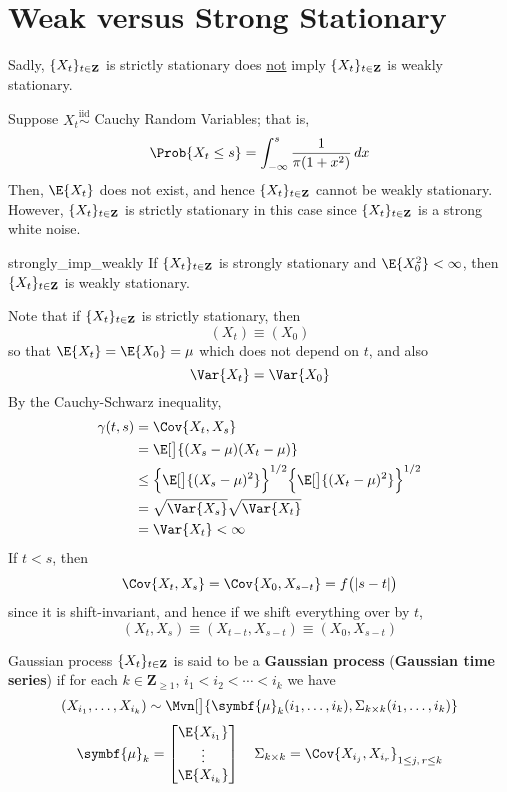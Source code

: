 \section{Weak versus Strong Stationary}
Sadly, $ \{X_t\}_{t\in\mathbf{Z}} $ is strictly stationary does \underline{not} imply
$ \{X_t\}_{t\in\mathbf{Z}} $ is weakly stationary.
\begin{Example}{}{}
    Suppose $ X_t\stackrel{\text{iid}}{\sim} $ Cauchy Random Variables;
    that is,
    \[ \Prob{X_t\le s}=\int_{-\infty}^{s} \frac{1}{\pi(1+x^2)}\, d{x}  \]
    Then, $ \E{X_t} $ does not exist, and hence $ \{X_t\}_{t\in\mathbf{Z}} $ cannot
    be weakly stationary. However, $ \{X_t\}_{t\in\mathbf{Z}} $ is strictly
    stationary in this case since $ \{X_t\}_{t\in\mathbf{Z}} $ is a strong
    white noise.
\end{Example}
\begin{Theorem}{}{strongly_imp_weakly}
    If $ \{X_t\}_{t\in\mathbf{Z}} $ is strongly stationary and $ \E{X_0^2}<\infty $,
    then $ \{X_t\}_{t\in\mathbf{Z}} $ is weakly stationary.
\end{Theorem}
\begin{Proof}{}{}
    Note that if $ \{X_t\}_{t\in\mathbf{Z}} $ is strictly stationary, then
    \[ (X_t)\equiv(X_0) \]
    so that $ \E{X_t}=\E{X_0}=\mu $ which does not depend on $ t $, and also
    \[ \Var{X_t}=\Var{X_0} \]
    By the Cauchy-Schwarz inequality,
    \begin{align*}
        \gamma(t,s)
         & =\Cov{X_t,X_s}                                                                     \\
         & =\E[\big]{(X_s-\mu)(X_t-\mu)}                                                      \\
         & \le \set[\Big]{\E[\big]{(X_s-\mu)^2}}^{1/2}\set[\Big]{\E[\big]{(X_t-\mu)^2}}^{1/2} \\
         & =\sqrt{\Var{X_s}}\sqrt{\Var{X_t}}                                                  \\
         & =\Var{X_t}<\infty
    \end{align*}
    If $ t<s $, then
    \[ \Cov{X_t,X_s}=\Cov{X_0,X_{s-t}}=f\bigl(\abs{s-t}\bigr) \]
    since it is shift-invariant, and hence if we shift everything over by $ t $,
    \[ (X_t,X_s)\equiv(X_{t-t},X_{s-t})\equiv(X_0,X_{s-t}) \]
\end{Proof}
\begin{Definition}{Gaussian process}{}
    $ \{X_t\}_{t\in\mathbf{Z}} $ is said to be a
    \textbf{Gaussian process} (\textbf{Gaussian time series}) if
    for each $ k\in\mathbf{Z}_{\ge 1} $, $ i_1<i_2<\cdots<i_k $ we have
    \[ (X_{i_1},\ldots,X_{i_k})\sim
        \Mvn[\big]{\symbf{\mu}_k(i_1,\ldots,i_k),\Sigma_{k\times k}(i_1,\ldots,i_k)} \]
    \[ \symbf{\mu}_k=\begin{bmatrix}
            \E{X_{i_1}} \\
            \vdots      \\
            \E{X_{i_k}}
        \end{bmatrix}\quad
        \Sigma_{k\times k}=
        \Cov{X_{i_j},X_{i_r}}_{1\le j,\, r\le k} \]
\end{Definition}
